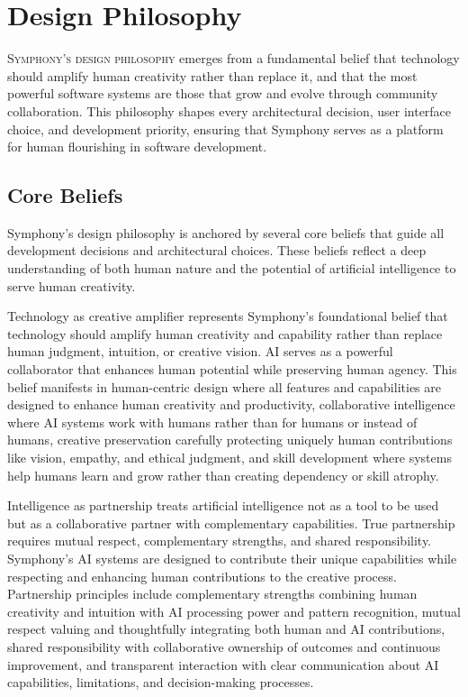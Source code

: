 
\section{Design Philosophy}
\label{sec:design-philosophy}

\lettrine{S}{ymphony's design philosophy} emerges from a fundamental belief that technology should amplify human creativity rather than replace it, and that the most powerful software systems are those that grow and evolve through community collaboration. This philosophy shapes every architectural decision, user interface choice, and development priority, ensuring that Symphony serves as a platform for human flourishing in software development.

\subsection{Core Beliefs}

Symphony's design philosophy is anchored by several core beliefs that guide all development decisions and architectural choices. These beliefs reflect a deep understanding of both human nature and the potential of artificial intelligence to serve human creativity.

Technology as creative amplifier represents Symphony's foundational belief that technology should amplify human creativity and capability rather than replace human judgment, intuition, or creative vision. AI serves as a powerful collaborator that enhances human potential while preserving human agency. This belief manifests in human-centric design where all features and capabilities are designed to enhance human creativity and productivity, collaborative intelligence where AI systems work with humans rather than for humans or instead of humans, creative preservation carefully protecting uniquely human contributions like vision, empathy, and ethical judgment, and skill development where systems help humans learn and grow rather than creating dependency or skill atrophy.

Intelligence as partnership treats artificial intelligence not as a tool to be used but as a collaborative partner with complementary capabilities. True partnership requires mutual respect, complementary strengths, and shared responsibility. Symphony's AI systems are designed to contribute their unique capabilities while respecting and enhancing human contributions to the creative process. Partnership principles include complementary strengths combining human creativity and intuition with AI processing power and pattern recognition, mutual respect valuing and thoughtfully integrating both human and AI contributions, shared responsibility with collaborative ownership of outcomes and continuous improvement, and transparent interaction with clear communication about AI capabilities, limitations, and decision-making processes.

